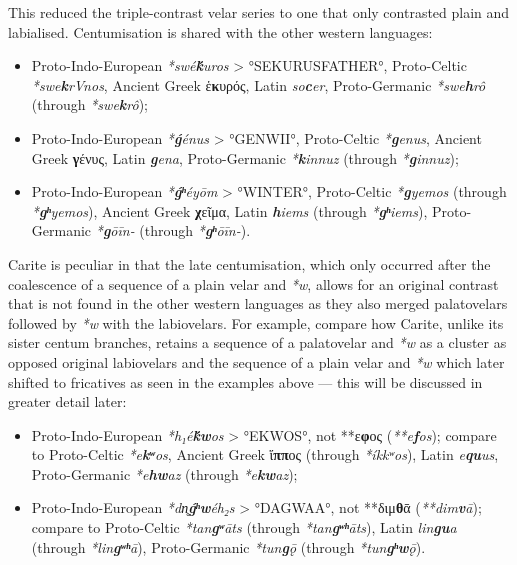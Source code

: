 \documentclass[svgnames,x11names,b5paper]{book}
\begin{document}
            This reduced the triple-contrast velar series to one that only contrasted plain and labialised. Centumisation is shared with the other western languages:
\begin{itemize}
\item  Proto-Indo-European \textit{*swé\textbf{ḱ}uros} > °SEKURUSFATHER°, Proto-Celtic \textit{*swe\textbf{k}rVnos}, Ancient Greek ἑ\textbf{κ}υρός, Latin \textit{so\textbf{c}er}, Proto-Germanic \textit{*swe\textbf{h}rô} (through \textit{*swe\textbf{k}rô});\\
\item  Proto-Indo-European \textit{*\textbf{ǵ}énus} > °GENWII°, Proto-Celtic \textit{*\textbf{g}enus}, Ancient Greek \textbf{γ}ένυς, Latin \textit{\textbf{g}ena}, Proto-Germanic \textit{*\textbf{k}innuz} (through \textit{*\textbf{g}innuz});\\
\item  Proto-Indo-European \textit{*\textbf{ǵʰ}éyōm} > °WINTER°, Proto-Celtic \textit{*\textbf{g}yemos} (through \textit{*\textbf{gʰ}yemos}), Ancient Greek \textbf{χ}εῖμα, Latin \textit{\textbf{h}iems} (through \textit{*\textbf{gʰ}iems}), Proto-Germanic \textit{*\textbf{g}ōīn-} (through \textit{*\textbf{gʰ}ōīn-}).\\
\end{itemize}
Carite is peculiar in that the late centumisation, which only occurred after the coalescence of a sequence of a plain velar and \textit{*w}, allows for an original contrast that is not found in the other western languages as they also merged palatovelars followed by \textit{*w} with the labiovelars. For example, compare how Carite, unlike its sister centum branches, retains a sequence of a palatovelar and \textit{*w} as a cluster as opposed original labiovelars and the sequence of a plain velar and \textit{*w} which later shifted to fricatives as seen in the examples above — this will be discussed in greater detail later:
\begin{itemize}
\item  Proto-Indo-European \textit{*h₁é\textbf{ḱw}os} > °EKWOS°, not  **ε\textbf{φ}ος (\textit{**e\textbf{f}os}); compare to Proto-Celtic \textit{*e\textbf{kʷ}os}, Ancient Greek ἵ\textbf{ππ}ος (through \textit{*íkkʷos}), Latin \textit{e\textbf{qu}us}, Proto-Germanic \textit{*e\textbf{hw}az} (through \textit{*e\textbf{kw}az});\\
\item  Proto-Indo-European \textit{*dn̥\textbf{ǵʰw}éh₂s} > °DAGWAA°, not **διμ\textbf{θ}ᾱ (\textit{**dim\textbf{v}ā}); compare to Proto-Celtic \textit{*tan\textbf{gʷ}āts} (through \textit{*tan\textbf{gʷʰ}āts}), Latin \textit{lin\textbf{gu}a} (through \textit{*lin\textbf{gʷʰ}ā}), Proto-Germanic \textit{*tun\textbf{g}ǭ} (through \textit{*tun\textbf{gʰw}ǭ}).\\
\end{itemize}
\end{document}
